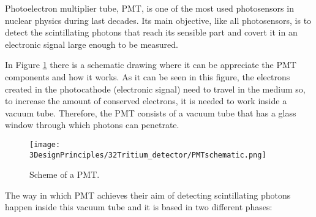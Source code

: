 Photoelectron multiplier tube, PMT, is one of the most used photosensors in nuclear physics during last decades. Its main objective, like all photosensors, is to detect the scintillating photons that reach its sensible part and covert it in an electronic signal large enough to be measured. 

In Figure \ref{fig:SchemePMT} there is a schematic drawing where it can be appreciate the PMT components and how it works. As it can be seen in this figure, the electrons created in the photocathode (electronic signal) need to travel in the medium so, to increase the amount of conserved electrons, it is needed to work inside a vacuum tube. Therefore, the PMT consists of a vacuum tube that has a glass window through which photons can penetrate.  

\begin{figure}[htbp]
\centering
\texttt{[image: 3DesignPrinciples/32Tritium\_detector/PMTschematic.png]}
\caption{Scheme of a PMT.\label{fig:SchemePMT}~\cite{Knoll}}
\end{figure}

The way in which PMT achieves their aim of detecting scintillating photons happen inside this vacuum tube and it is based in two different phases:

